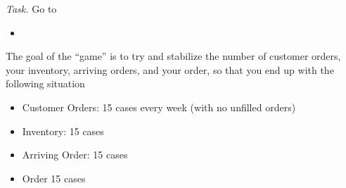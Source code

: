 \newpage

\emph{Task. } Go to 
\begin{itemize}
	\item {}	
\end{itemize}

The goal of the ``game'' is to try and stabilize the number of customer orders, your inventory, arriving orders, and your order, so that you end up with the following situation
\begin{itemize}
\item Customer Orders: 15 cases every week (with no unfilled orders)
\item Inventory: 15 cases
\item Arriving Order: 15 cases
\item Order 15 cases
\end{itemize}

